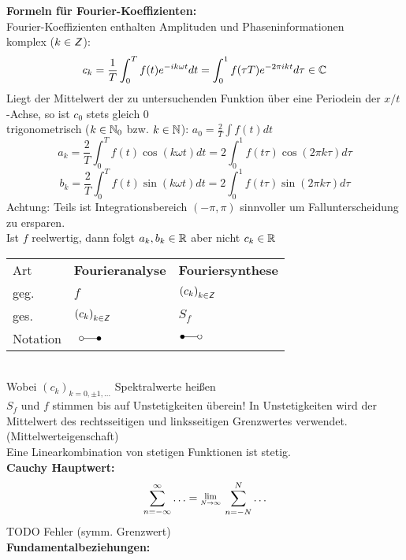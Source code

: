\documentclass[nocolor,german]{latex4ei/latex4ei_sheet}
\newcommand{\Lim}[1]{\raisebox{0.5ex}{\scalebox{0.8}{$\displaystyle \lim_{#1    }\;$}}}
\newcommand{\iftsymbol}{\mbox{\setlength{\unitlength}{0.1em}\begin{picture}(25,4)\put(3,3){\circle*{4}}\put(4,3){\line(1,0){13}}\put(19,3){\circle{4}}\end{picture}}}
\DeclareMathOperator{\T}{\overset{\scriptscriptstyle\mathcal{}}{\ftsymbol}}						%
\begin{document}
\textbf{Formeln f\"ur Fourier-Koeffizienten:}\\
Fourier-Koeffizienten enthalten Amplituden und Phaseninformationen\\
komplex ($k \in \operatorname{\textsf{\textit{Z}}}$): \[c_k=\frac{1}{T}\int_0^T f(t) e^{-i k \omega t} d t = \int_0^1 f(\tau T) e^{-2 \pi i k t} d \tau \in \mathbb C\]
Liegt der Mittelwert der zu untersuchenden Funktion \"uber eine Periodein der $x/t$-Achse, so ist $c_0$ stets gleich $0$\\
trigonometrisch ($k \in \operatorname{\mathbb N}_0$ bzw. $k \in \operatorname{\mathbb N}$):
$a_0=\frac{2}{T} \int f(t) d t$
\[a_k=\frac{2}{T}\int_0^T f(t) \cos (k \omega t) d t = 2 \int_0^1 f(t \tau) \cos (2 \pi k \tau) d \tau\]
\[b_k=\frac{2}{T}\int_0^T f(t) \sin (k \omega t) d t = 2 \int_0^1 f(t \tau) \sin (2 \pi k \tau) d \tau\]
Achtung: Teils ist Integrationsbereich $(-\pi,\pi)$ sinnvoller um Fallunterscheidung zu ersparen.\\
Ist $f$ reelwertig, dann folgt $a_k,b_k \in \operatorname{\mathbb R}$ aber nicht $c_k \in \operatorname{\mathbb R}$\\
\begin{tabular}{|l|l|l|}
        Art & \textbf{Fourieranalyse} & \textbf{Fouriersynthese} \\ 
		geg. & $f$ & ${(c_k)}_{k\in \operatorname{\textsf{\textit{Z}}}}$ \\ 
		ges. & ${(c_k)}_{k\in \operatorname{\textsf{\textit{Z}}}}$ & $S_f$ \\ 
        Notation & $\T$ & $\iftsymbol$ \\
\end{tabular}\\
Wobei ${(c_k)}_{k=0,\pm 1,\ldots}$ Spektralwerte hei\ss{}en\\
$S_f$ und $f$ stimmen bis auf Unstetigkeiten \"uberein! In Unstetigkeiten wird der Mittelwert des rechtsseitigen und linksseitigen Grenzwertes verwendet. (Mittelwerteigenschaft)\\
Eine Linearkombination von stetigen Funktionen ist stetig.\\
\textbf{Cauchy Hauptwert:} \[\sum_{n=-\infty}^{\infty}\ldots=\Lim{N \to \infty} \sum_{n=-N}^N \ldots\] TODO Fehler (symm. Grenzwert)\\
\textbf{Fundamentalbeziehungen:}
\end{document}
